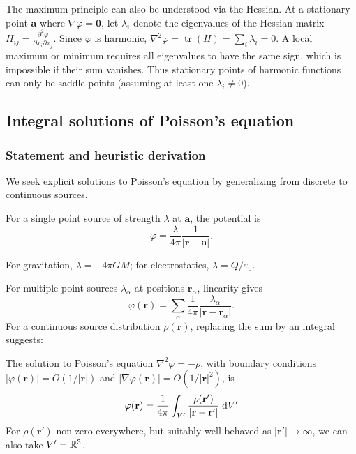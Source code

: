 \documentclass[a4paper]{article}
\begin{document}
\begin{rmk}
  The maximum principle can also be understood via the Hessian. At a stationary point $\mathbf{a}$ where $\nabla\varphi = \mathbf{0}$, let $\lambda_i$ denote the eigenvalues of the Hessian matrix $H_{ij} = \frac{\partial^2 \varphi}{\partial x_i \partial x_j}$. Since $\varphi$ is harmonic, $\nabla^2 \varphi = \operatorname{tr}(H) = \sum_i \lambda_i = 0$. A local maximum or minimum requires all eigenvalues to have the same sign, which is impossible if their sum vanishes. Thus stationary points of harmonic functions can only be saddle points (assuming at least one $\lambda_i \neq 0$).
\end{rmk}
\subsection{Integral solutions of Poisson's equation}
\subsubsection{Statement and heuristic derivation}
We seek explicit solutions to Poisson's equation by generalizing from discrete to continuous sources.

For a single point source of strength $\lambda$ at $\mathbf{a}$, the potential is
\[
  \varphi = \frac{\lambda}{4\pi} \frac{1}{|\mathbf{r} - \mathbf{a}|}.
\]

\begin{rmk}
  For gravitation, $\lambda = -4\pi GM$; for electrostatics, $\lambda = Q/\varepsilon_0$.
\end{rmk}

For multiple point sources $\lambda_\alpha$ at positions $\mathbf{r}_\alpha$, linearity gives
\[
  \varphi(\mathbf{r}) = \sum_{\alpha} \frac{1}{4\pi}\frac{\lambda_\alpha}{|\mathbf{r} - \mathbf{r}_\alpha|}.
\]
For a continuous source distribution $\rho(\mathbf{r})$, replacing the sum by an integral suggests:

\begin{prop}
  The solution to Poisson's equation $\nabla^2 \varphi = -\rho$, with boundary conditions $|\varphi (\mathbf{r})| = O(1/|\mathbf{r}|)$ and $|\nabla\varphi(\mathbf{r})| = O(1/|\mathbf{r}|^2)$, is
  \[
    \varphi(\mathbf{r}) = \frac{1}{4\pi}\int_{V'} \frac{\rho(\mathbf{r}')}{|\mathbf{r} - \mathbf{r}'|}\;\mathrm{d} V'
  \]
  For $\rho(\mathbf{r}')$ non-zero everywhere, but suitably well-behaved as $|\mathbf{r}'| \to \infty$, we can also take $V' = \mathbb{R}^3$.
\end{prop}
\end{document}
